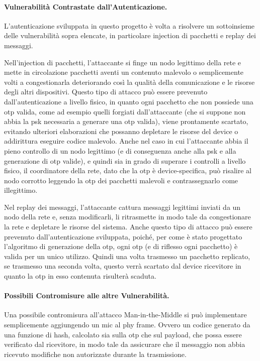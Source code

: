 \paragraph{Vulnerabilità Contrastate dall'Autenticazione.}

L'autenticazione sviluppata in questo progetto è volta a risolvere un sottoinsieme delle vulnerabilità sopra elencate, in particolare injection di pacchetti e replay dei messaggi.

Nell'injection di pacchetti, l'attaccante si finge un nodo legittimo della rete e mette in circolazione pacchetti aventi un contenuto malevolo o semplicemente volti a congestionarla deteriorando così la qualità della comunicazione e le risorse degli altri dispositivi. Questo tipo di attacco può essere prevenuto dall'autenticazione a livello fisico, in quanto ogni pacchetto che non possiede una \gls{otp} valida, come ad esempio quelli forgiati dall'attaccante (che si suppone non abbia la \gls{psk} necessaria a generare una \gls{otp} valida), viene prontamente scartato, evitando ulteriori elaborazioni che possanno depletare le risorse del device o addirittura eseguire codice malevolo. Anche nel caso in cui l'attaccante abbia il pieno controllo di un nodo legittimo (e di conseguenza anche alla \gls{psk} e alla generazione di \gls{otp} valide), e quindi sia in grado di superare i controlli a livello fisico, il coordinatore della rete, dato che la \gls{otp} è device-specifica, può risalire al nodo corrotto leggendo la \gls{otp} dei pacchetti malevoli e contrassegnarlo come illegittimo.

Nel replay dei messaggi, l'attaccante cattura messaggi legittimi inviati da un nodo della rete e, senza modificarli, li ritrasmette in modo tale da congestionare la rete e depletare le risorse del sistema. Anche questo tipo di attacco può essere prevenuto dall'autenticazione sviluppata, poiché, per come è stato progettato l'algoritmo di generazione della \gls{otp}, ogni \gls{otp} (e di riflesso ogni pacchetto) è valida per un unico utilizzo. Quindi una volta trasmesso un pacchetto replicato, se trasmesso una seconda volta, questo verrà scartato dal device ricevitore in quanto la \gls{otp} in esso contenuta risulterà scaduta.


\paragraph{Possibili Contromisure alle altre Vulnerabilità.}
Una possibile contromisura all'attacco Man-in-the-Middle si può implementare semplicemente aggiungendo un \gls{mic} al \gls{phy} frame. Ovvero un codice generato da una funzione di hash, calcolato sia sulla \gls{otp} che sul payload, che possa essere verificato dal ricevitore, in modo tale da assicurare che il messaggio non abbia ricevuto modifiche non autorizzate durante la trasmissione.

